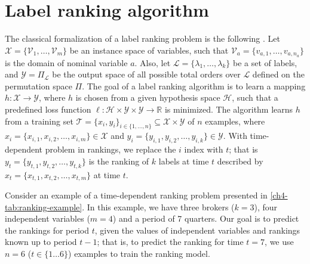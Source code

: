 \documentclass{llncs}\usepackage[]{graphicx}\usepackage[]{color}
\begin{document}
\section{Label ranking algorithm}
\label{ch4-sec:lr}

The classical formalization of a label ranking problem is the following \cite{vembu2009}. Let $\mathcal{X} = \{\mathcal{V}_1,\ldots,\mathcal{V}_m\}$ be an instance space of  variables, such that $\mathcal{V}_a=\{v_{a,1}, \ldots, v_{a,n_a}\}$ is the domain of nominal variable $a$.  Also, let $\mathcal{L} = \{\lambda_1,\ldots,\lambda_k\}$ be a set of labels, and $\mathcal{Y} = \Pi_{\mathcal{L}}$ be the output space of all possible total orders over $\mathcal{L}$ defined on the permutation space $\Pi$. The goal of a label ranking algorithm is to learn a mapping $h: \mathcal{X} \rightarrow \mathcal{Y}$, where $h$ is chosen from a given hypothesis space $\mathcal{H}$, such that a predefined loss function $\ell: \mathcal{H} \times \mathcal{Y} \times \mathcal{Y} \rightarrow \mathbb{R}$ is minimized. The algorithm learns $h$ from a training set $\mathcal{T}=\{x_i,y_i\}_{i \in \{1, \ldots, n\}} \subseteq \mathcal{X} \times \mathcal{Y}$ of $n$ examples, where $x_i = \{x_{i,1}, x_{i,2}, \ldots, x_{i,m} \} \in \mathcal{X}$ and $ y_i = \{y_{i,1}, y_{i,2}, \dots, y_{i,k}\} \in \mathcal{Y} $. With time-dependent problem in rankings, we replace the $i$ index with $t$; that is $y_t=\{ y_{t,1}, y_{t,2}, \ldots, y_{t,k} \}$ is the ranking of $k$ labels at time $t$ described by $x_t = \{x_{t,1}, x_{t,2}, \ldots, x_{t,m} \} $ at time $t$.


Consider an example of a time-dependent ranking problem presented in \ref{ch4-tab:ranking-example}. In this example, we have three brokers ($k=3$), four independent variables ($m=4$) and a period of 7 quarters. Our goal is to predict the rankings for period $t$, given the values of independent variables and rankings known up to period $t-1$; that is, to predict the ranking for time $t=7$, we use $n=6$ ($t \in \{1 \ldots 6\}$) examples to train the ranking model.
\end{document}
